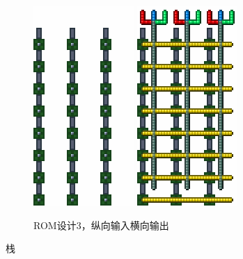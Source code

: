 \begin{figure}
    \centering
    \includegraphics{images/346.png}
    \qquad
    \includegraphics{images/345.png}
    \caption{ROM设计3，纵向输入横向输出}
\end{figure}
栈